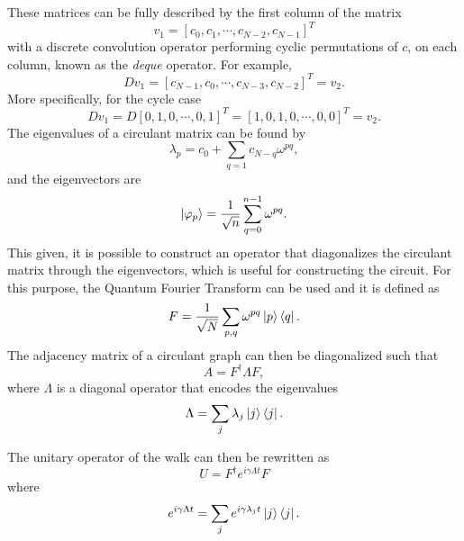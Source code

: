 \documentclass[../../dissertation.tex]{subfiles}
\begin{document}
These matrices can be fully described by the first column of the matrix 
\begin{equation}
	v_1 = [c_{0},c_{1}, \cdots, c_{N-2}, c_{N-1}]^T 
\end{equation}
with a discrete convolution operator performing cyclic permutations of $c$, on
each column, known as the \textit{deque} operator. For example,
\begin{equation}
	D v_1 = [c_{N-1}, c_{0}, \cdots, c_{N-3}, c_{N-2}]^T = v_2.
\end{equation}
More specifically, for the cycle case
\begin{equation}
	D v_1 = D [0, 1 ,0 , \cdots, 0, 1]^T =[1, 0, 1, 0, \cdots, 0, 0]^T = v_2.
\end{equation}
The eigenvalues of a circulant matrix can be found by
\begin{equation}
\lambda_p = c_0 + \sum_{q=1} c_{N-q} \omega^{pq},
\end{equation}
and the eigenvectors are 
\begin{equation}
\ket{\varphi_p} = \frac{1}{\sqrt{n}} \sum_{q=0}^{n-1} \omega^{pq}.
\end{equation}
This given, it is possible to construct an operator that diagonalizes the
circulant matrix through the eigenvectors, which is useful for constructing the
circuit. For this purpose, the Quantum Fourier Transform can be used and it is
defined as 
\begin{equation}
F = \frac{1}{\sqrt{N}} \sum_{p,q} \omega^{pq} \ket{p}\bra{q}.
\end{equation}
The adjacency matrix of a circulant graph can then be diagonalized such that
\begin{equation}
    A = F^{\dagger} \Lambda F,
    \label{eq:qiskitContQWAdj}
\end{equation}
where $\Lambda$ is a diagonal operator that encodes the eigenvalues
\begin{equation}
\Lambda = \sum_{j} \lambda_j \ket{j}\bra{j}.
\end{equation}\par
The unitary operator of the walk can then be rewritten as
\begin{equation}\label{eq:diagUniOpCont}
    U = F^{\dagger}e^{i\gamma \Lambda t} F
\end{equation}
where
\begin{equation}
    e^{i\gamma \Lambda t} = \sum_{j} e^{i\gamma \lambda_j t} \ket{j}\bra{j}.
\end{equation}
\end{document}
